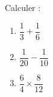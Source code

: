
\begin{exercice}\label{exo2smath-0001}

    Calculer :
    \begin{enumerate}
        \item
            \( \dfrac{ 1 }{ 3 }+\dfrac{ 1 }{ 6 }\)
        \item
            \( \dfrac{ 1 }{ 20 }-\dfrac{ 1 }{ 10 }\)
        \item
            \( \dfrac{ 6 }{ 4 }\times \dfrac{ 8 }{ 12 }\)
    \end{enumerate}

\end{exercice}
